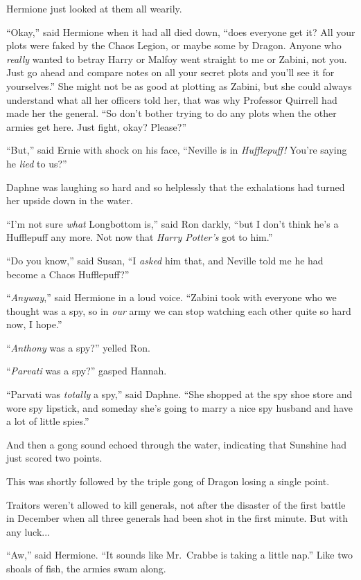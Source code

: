 Hermione just looked at them all wearily.

“Okay,” said Hermione when it had all died down, “does everyone get it? All your plots were faked by the Chaos Legion, or maybe some by Dragon. Anyone who \emph{really} wanted to betray Harry or Malfoy went straight to me or Zabini, not you. Just go ahead and compare notes on all your secret plots and you’ll see it for yourselves.” She might not be as good at plotting as Zabini, but she could always understand what all her officers told her, that was why Professor Quirrell had made her the general. “So don’t bother trying to do any plots when the other armies get here. Just fight, okay? Please?”

“But,” said Ernie with shock on his face, “Neville is in \emph{Hufflepuff!} You’re saying he \emph{lied} to us?”

Daphne was laughing so hard and so helplessly that the exhalations had turned her upside down in the water.

“I’m not sure \emph{what} Longbottom is,” said Ron darkly, “but I don’t think he’s a Hufflepuff any more. Not now that \emph{Harry Potter’s} got to him.”

“Do you know,” said Susan, “I \emph{asked} him that, and Neville told me he had become a Chaos Hufflepuff?”

“\emph{Anyway},” said Hermione in a loud voice. “Zabini took with everyone who we thought was a spy, so in \emph{our} army we can stop watching each other quite so hard now, I hope.”

“\emph{Anthony} was a spy?” yelled Ron.

“\emph{Parvati} was a spy?” gasped Hannah.

“Parvati was \emph{totally} a spy,” said Daphne. “She shopped at the spy shoe store and wore spy lipstick, and someday she’s going to marry a nice spy husband and have a lot of little spies.”

And then a gong sound echoed through the water, indicating that Sunshine had just scored two points.

This was shortly followed by the triple gong of Dragon losing a single point.

Traitors weren’t allowed to kill generals, not after the disaster of the first battle in December when all three generals had been shot in the first minute. But with any luck...

“Aw,” said Hermione. “It sounds like Mr.~Crabbe is taking a little nap.”
\sbreak
Like two shoals of fish, the armies swam along.


